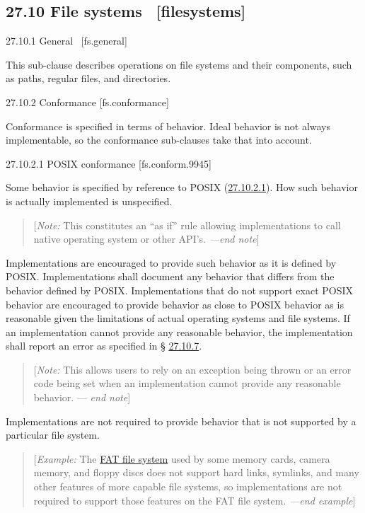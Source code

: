 \subsection{27.10 File systems~ {[}filesystems{]}}

27.10.1 General~ {[}fs.general{]}

This sub-clause describes operations on file systems and their
components, such as paths, regular files, and directories.

27.10.2 Conformance {[}fs.conformance{]}

Conformance is specified in terms of behavior. Ideal behavior is not
always implementable, so the conformance sub-clauses take that into
account.

27.10.2.1 POSIX conformance {[}fs.conform.9945{]}

Some behavior is specified by reference to POSIX
(\hyperref[fs.norm.ref]{27.10.2.1}). How such behavior is actually
implemented is unspecified.

\begin{quote}
{[}\emph{Note:} This constitutes an ``as if'' rule allowing
implementations to call native operating system or other API's.
\emph{---end note}{]}
\end{quote}

Implementations are encouraged to provide such behavior as it is defined
by POSIX. Implementations shall document any behavior that differs from
the behavior defined by POSIX. Implementations that do not support exact
POSIX behavior are encouraged to provide behavior as close to POSIX
behavior as is reasonable given the limitations of actual operating
systems and file systems. If an implementation cannot provide any
reasonable behavior, the implementation shall report an error as
specified in § \hyperref[fs.norm.ref]{27.10.7}.

\begin{quote}
{[}\emph{Note:} This allows users to rely on an exception being thrown
or an error code being set when an implementation cannot provide any
reasonable behavior. --- \emph{end note}{]}
\end{quote}

Implementations are not required to provide behavior that is not
supported by a particular file system.

\begin{quote}
{[}\emph{Example:} The
\href{http://en.wikipedia.org/wiki/FAT_filesystem}{FAT file system} used
by some memory cards, camera memory, and floppy discs does not support
hard links, symlinks, and many other features of more capable file
systems, so implementations are not required to support those features
on the FAT file system. \emph{---end example}{]}
\end{quote}


